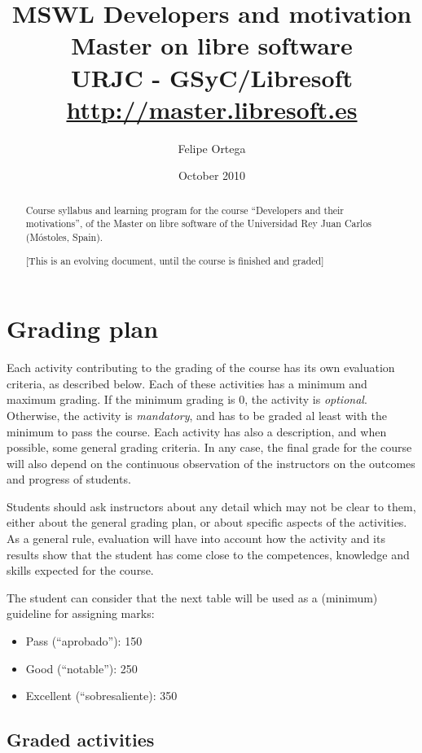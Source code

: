 \documentclass[a4paper]{article}
\title{MSWL Developers and motivation \\
Master on libre software \\
URJC - GSyC/Libresoft \\
\url{http://master.libresoft.es}}
\author{Felipe Ortega}
\date{October 2010}
\begin{document}
\maketitle

\begin{abstract}
Course syllabus and learning program for the course ``Developers and their motivations'', 
of the Master on libre software of the Universidad Rey Juan Carlos (Móstoles, Spain).

[This is an evolving document, until the course is finished and graded]
\end{abstract}

\tableofcontents

\section{Grading plan}

Each activity contributing to the grading of the course has its own evaluation criteria, 
as described below. Each of these activities has a minimum and maximum grading. If the 
minimum grading is 0, the activity is \textit{optional}. Otherwise, the activity is \textit{mandatory}, and 
has to be graded al least with the minimum to pass the course. Each activity has also a 
description, and when possible, some general grading criteria. In any case, the final grade 
for the course will also depend on the continuous observation of the instructors on the 
outcomes and progress of students.

Students should ask instructors about any detail which may not be clear to them, 
either about the general grading plan, or about specific aspects of the activities. 
As a general rule, evaluation will have into account how the activity and its results 
show that the student has come close to the competences, knowledge and skills expected 
for the course.

The student can consider that the next table will be used as a (minimum) guideline for 
assigning marks:

\begin{itemize}
\item Pass (``aprobado''): 150
\item Good (``notable''): 250
\item Excellent (``sobresaliente): 350
\end{itemize}

\subsection{Graded activities}
\end{document}
